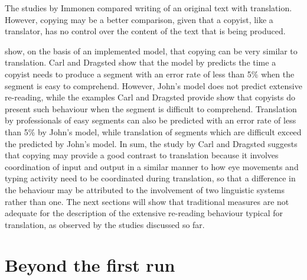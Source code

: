 \documentclass[output=paper]{LSP/langsci}
\begin{document}
The studies by Immonen compared writing of an original text with translation. However, copying may be a better comparison, given that a copyist, like a translator, has no control over the content of the text that is being produced.

\citet{Carl2012Inside} show, on the basis of an implemented model, that copying can be very similar to translation. Carl and Dragsted show that the model by \citet{John1996} predicts the time a copyist needs to produce a segment with an error rate of less than 5\% when the segment is easy to comprehend. However, John's model does not predict extensive re-reading, while the examples Carl and Dragsted provide show that copyists do present such behaviour when the segment is difficult to comprehend. Translation by professionals of easy segments can also be predicted with an error rate of less than 5\% by John's model, while translation of segments which are difficult exceed the  predicted by John's model. In sum, the study by Carl and Dragsted suggests that copying may provide a good contrast to translation because it involves coordination of input and output in a similar manner to how eye movements and typing activity need to be coordinated during translation, so that a difference in the behaviour may be attributed to the involvement of two linguistic systems rather than one. The next sections will show that traditional  measures are not adequate for the description of the extensive re-reading behaviour typical for translation, as observed by the studies discussed so far.

\section{Beyond the first run}
\end{document}
